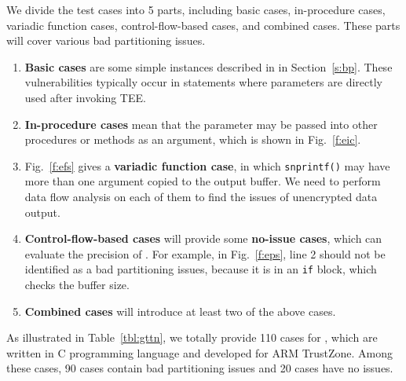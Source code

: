 We divide the test cases into 5 parts, including basic cases, in-procedure cases, variadic function cases, control-flow-based cases, and combined cases. These parts will cover various bad partitioning issues.
\begin{enumerate}
    \item \textbf{Basic cases} are some simple instances described in in Section~\ref{s:bp}. These vulnerabilities typically occur in statements where parameters are directly used after invoking TEE.
    \item \textbf{In-procedure cases} mean that the parameter may be passed into other procedures or methods as an argument, which is shown in Fig.~\ref{f:eic}.
    \item Fig.~\ref{f:efs} gives a \textbf{variadic function case}, in which \texttt{snprintf()} may have more than one argument copied to the output buffer. We need to perform data flow analysis on each of them to find the issues of unencrypted data output.
    \item \textbf{Control-flow-based cases} will provide some \textbf{no-issue cases}, which can evaluate the precision of \ccSysName. For example, in Fig.~\ref{f:eps}, line 2 should not be identified as a bad partitioning issues, because it is in an \texttt{if} block, which checks the buffer size.
    \item \textbf{Combined cases} will introduce at least two of the above cases.
\end{enumerate}

As illustrated in Table~\ref{tbl:gttn}, we totally provide 110 cases for \ccBenchName, which are written in C programming language and developed for ARM TrustZone. Among these cases, 90 cases contain bad partitioning issues and 20 cases have no issues.


